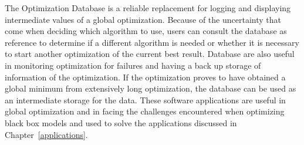 The Optimization Database is a reliable replacement for logging and displaying intermediate values of a global optimization. Because of the uncertainty that come when deciding which algorithm to use, users can consult the database as reference to determine if a different algorithm is needed or whether it is necessary to start another optimization of the current best result. Database are also useful in monitoring optimization for failures and having a back up storage of information of the
optimization. If the optimization proves to have obtained a global minimum from extensively long optimization, the database can be used as an intermediate storage for the data.  
These software applications are useful in global optimization and in facing the challenges encountered when optimizing black box models and used to solve the applications discussed in Chapter~\ref{applications}. 
